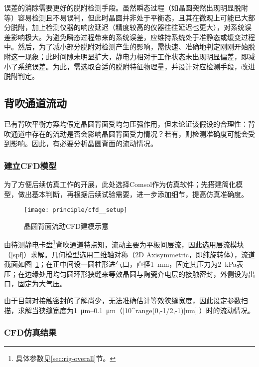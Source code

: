 误差的消除需要更好的脱附检测手段。虽然瞬态过程（如晶圆突然出现明显脱附等）容易检测且不易误判，但此时晶圆并非处于平衡态，且其在微观上可能已大部分脱附，加上检测仪器的响应延迟（精度较高的仪器往往延迟也更大），对系统误差影响极大。为避免瞬态过程带来的系统误差，应维持系统处于准静态或缓变过程中。然后，为了减小部分脱附对检测产生的影响，需快速、准确地判定刚刚开始脱附这一现象；此时间隙未明显扩大，静电力相对于工作状态未出现明显偏差，即减小了系统误差。为此，需选取合适的脱附特征物理量，并设计对应检测手段，改进脱附判定。


\subsection{背吹通道流动}\label{sec:principle-prob-flow}

已有背吹平衡方案均假定晶圆背面受均匀压强作用，但未论证该假设的合理性：背吹通道中存在的流动是否会影响晶圆背面受力情况？若有，则检测准确度可能会受到影响。因此，有必要分析晶圆背面的流动情况。

\subsubsection{建立CFD模型}\label{sec:principle-prob-flow-cfd-setup}

为了方便后续仿真工作的开展，此处选择Comsol作为仿真软件；先搭建简化模型，做出基本判断，再根据后续试验需要，进一步添加细节，提高仿真准确度。

\begin{figure}[tbh]
\centering
\texttt{[image: principle/cfd\_\_setup]}
\caption{晶圆背面流动CFD建模示意}
\label{fig:principle-flow-cfd-setup}
\end{figure}

由待测静电卡盘\footnote{具体参数见\ref{sec:rig-overall}节。}背吹通道特点知，流动主要为平板间层流，因此选用层流模块（\bverb|spf|）求解。几何模型选用二维轴对称（2D Axisymmetric，即纯旋转体），流道截面如图~\ref{fig:principle-flow-cfd-setup}\footnotemark{}；在正中间设一圆柱形进气口，直径\SI{1}{\mm}，固定其压力为\SI{2}{\kPa}表压；在边缘处用均匀圆环形狭缝来等效晶圆与陶瓷介电层的接触密封，外侧设为出口，固定为大气压。


由于目前对接触密封的了解尚少，无法准确估计等效狭缝宽度，因此设定参数扫描，求解当狭缝宽度为\SIrange{1}{0.1}{\um}（\bverb|10^{range(0,-1/2,-1)}[um]|）时的流动情况。

\subsubsection{CFD仿真结果}\label{sec:principle-prob-flow-cfd-result}

